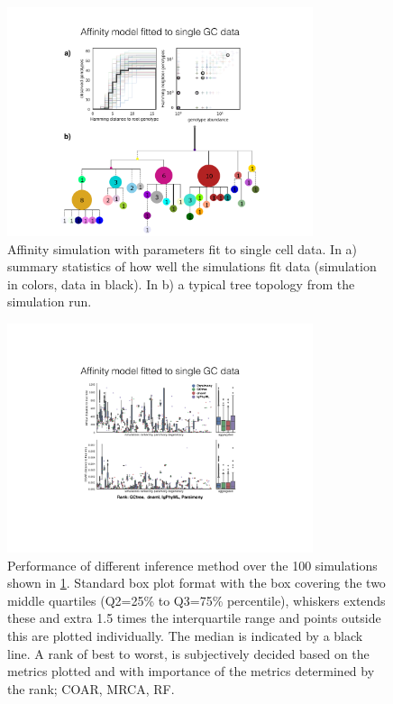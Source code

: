 \begin{figure}[!ht]
    \centering
    \includegraphics[width=0.8\textwidth]{figures/Tas-affsim_runstat.pdf}
    \caption{
        \label{fig:Tas-affsim_runstat}
        Affinity simulation with parameters fit to single cell data. In a) summary statistics of how well the simulations fit data (simulation in colors, data in black). In b) a typical tree topology from the simulation run.
    }
\end{figure}
\begin{figure}[!ht]
    \centering
    \includegraphics[width=0.8\textwidth]{figures/Tas-affsim_vali.pdf}
    \caption{
        \label{fig:Tas-affsim_vali}
        Performance of different inference method over the 100 simulations shown in \ref{fig:Tas-affsim_runstat}.
        Standard box plot format with the box covering the two middle quartiles (Q2=25\% to Q3=75\% percentile), whiskers extends these and extra 1.5 times the interquartile range and points outside this are plotted individually.
        The median is indicated by a black line.
        A rank of best to worst, is subjectively decided based on the metrics plotted and with importance of the metrics determined by the rank; COAR, MRCA, RF.
    }
\end{figure}

